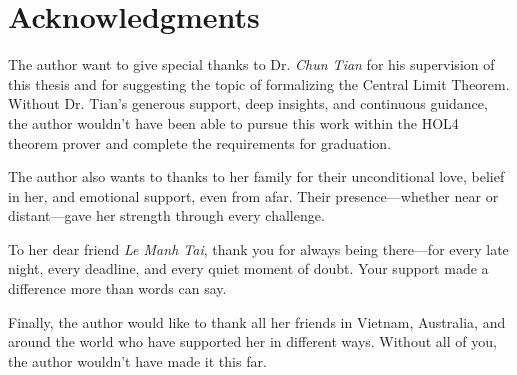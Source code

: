 \chapter*{Acknowledgments}
\label{ack}

The author want to give special thanks to Dr. \emph{Chun Tian} for his supervision of this thesis and for suggesting the topic of formalizing the Central Limit Theorem. Without Dr. Tian’s generous support, deep insights, and continuous guidance, the author wouldn't have been able to pursue this work within the HOL4 theorem prover and complete the requirements for graduation.

The author also wants to thanks to her family for their unconditional love, belief in her, and emotional support, even from afar. Their presence—whether near or distant—gave her strength through every challenge.

To her dear friend \emph{Le Manh Tai}, thank you for always being there—for every late night, every deadline, and every quiet moment of doubt. Your support made a difference more than words can say.

Finally, the author would like to thank all her friends in Vietnam, Australia, and around the world who have supported her in different ways. Without all of you, the author wouldn’t have made it this far.
